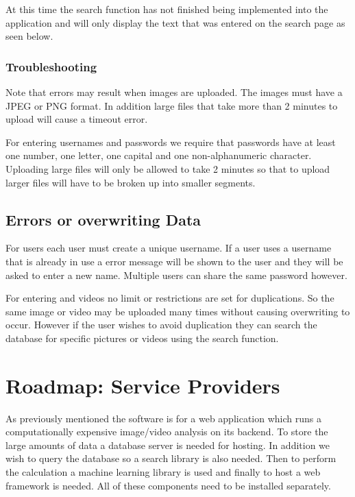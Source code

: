 \documentclass{scrreprt}
\begin{document}
At this time the search function has not finished being implemented into the
application and will only display the text that was entered on the search page
as seen below.


\subsubsection{Troubleshooting}

Note that errors may result when images are uploaded.  The images must have a
JPEG or PNG format.  In addition large files that take more than 2 minutes to
upload will cause a timeout error.

For entering usernames and passwords we require that passwords have at least
one number, one letter, one capital and one non-alphanumeric character.
Uploading large files will only be allowed to take 2 minutes so that to upload
larger files will have to be broken up into smaller segments.


\subsection{Errors or overwriting Data}

For users each user must create a unique username.  If a user uses a username
that is already in use a error message will be shown to the user and they will
be asked to enter a new name.  Multiple users can share the same password
however.

For entering and videos no limit or restrictions are set for duplications.  So
the same image or video may be uploaded many times without causing overwriting
to occur.  However if the user wishes to avoid duplication they can search the
database for specific pictures or videos using the search function.


\section{Roadmap: Service Providers}

As previously mentioned the software is for a  web application which runs a
computationally expensive image/video analysis on its backend. To store the
large amounts of data a database server is needed for hosting.  In addition we
wish to query the database so a search library is also needed. Then to perform
the calculation a machine learning library is used and finally to host a web
framework is needed. All of these components need to be installed separately.
\end{document}
